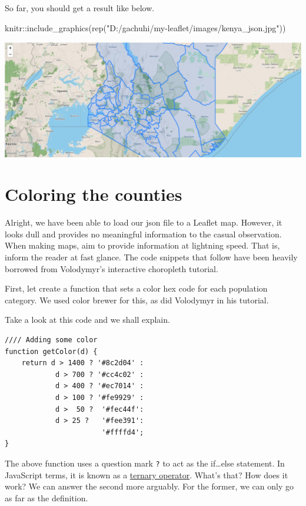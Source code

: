 \documentclass[
]{book}
\newenvironment{Shaded}{\begin{snugshade}}{\end{snugshade}}
\newcommand{\FunctionTok}[1]{\textcolor[rgb]{0.00,0.00,0.00}{#1}}
\newcommand{\NormalTok}[1]{#1}
\newcommand{\SpecialCharTok}[1]{\textcolor[rgb]{0.00,0.00,0.00}{#1}}
\newcommand{\StringTok}[1]{\textcolor[rgb]{0.31,0.60,0.02}{#1}}
\begin{document}
So far, you should get a result like below.

\begin{Shaded}
\begin{Highlighting}[]
\NormalTok{knitr}\SpecialCharTok{::}\FunctionTok{include\_graphics}\NormalTok{(}\FunctionTok{rep}\NormalTok{(}\StringTok{"D:/gachuhi/my{-}leaflet/images/kenya\_json.jpg"}\NormalTok{))}
\end{Highlighting}
\end{Shaded}

\includegraphics[width=26in]{../images/kenya_json}

\hypertarget{coloring-the-counties}{%
\section{Coloring the counties}\label{coloring-the-counties}}

Alright, we have been able to load our json file to a Leaflet map. However, it looks dull and provides no meaningful information to the casual observation. When making maps, aim to provide information at lightning speed. That is, inform the reader at fast glance. The code snippets that follow have been heavily borrowed from Volodymyr's interactive choropleth tutorial.

First, let create a function that sets a color hex code for each population category. We used color brewer for this, as did Volodymyr in his tutorial.

Take a look at this code and we shall explain.

\begin{verbatim}
//// Adding some color
function getColor(d) {
    return d > 1400 ? '#8c2d04' :
            d > 700 ? '#cc4c02' :
            d > 400 ? '#ec7014' :
            d > 100 ? '#fe9929' :
            d >  50 ?  '#fec44f':
            d > 25 ?   '#fee391':
                       '#ffffd4';
}
\end{verbatim}

The above function uses a question mark \texttt{?} to act as the if\ldots else statement. In JavaScript terms, it is known as a \href{https://www.freecodecamp.org/news/how-the-question-mark-works-in-javascript/}{ternary operator}. What's that? How does it work? We can answer the second more arguably. For the former, we can only go as far as the definition.
\end{document}
